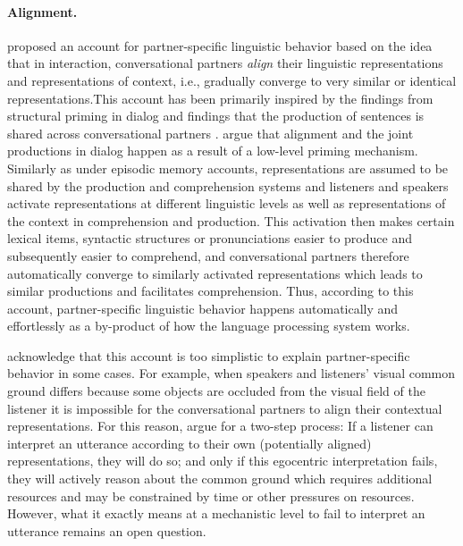 \paragraph{Alignment.} \textcite{Pickering2004} proposed an account for partner-specific linguistic behavior based on the idea
that in interaction, conversational partners \textit{align} their linguistic representations and representations of context, i.e., gradually converge to very similar or identical 
representations.This account has been primarily inspired by the findings from structural priming in dialog  and findings that the production
of sentences is shared across conversational partners . \textcite{Pickering2004} argue that alignment and the joint productions in dialog happen
as a result of a low-level priming mechanism. Similarly as under episodic memory accounts, representations are assumed to be shared by the production and comprehension systems and 
listeners and speakers activate representations at different linguistic levels as well as 
representations of the context in comprehension and production. This activation then makes certain lexical items, syntactic structures or pronunciations easier to produce 
and subsequently easier to comprehend, and conversational partners therefore automatically 
converge to similarly activated representations which leads to similar productions and facilitates comprehension. Thus, according to this account, partner-specific linguistic behavior 
happens automatically and effortlessly as a by-product of how the language processing system works.

\textcite{Pickering2004} acknowledge that this account is too simplistic to explain partner-specific behavior in some cases.
For example, when speakers and listeners' visual common ground differs because some objects are occluded from the visual field
of the listener \parencite[as in experiments by, e.g.,][]{Keysar2000,Heller2008} it is impossible for the conversational partners to align their
contextual representations. For this reason, \textcite{Pickering2004} argue for a two-step process: If a listener can interpret 
an utterance according to their own (potentially aligned) representations, they will do so; and only if this egocentric interpretation
fails, they will actively reason about the common ground which requires additional resources and may be constrained by time or
other pressures on resources. However, what it exactly means at a mechanistic level to fail to interpret an utterance remains an open
question.

